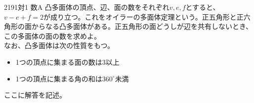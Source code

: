 \begin{thm}{219}{}{1対1 数A}
 凸多面体の頂点、辺、面の数をそれぞれ$v, e, f$とすると、$v-e+f=2$が成り立つ。これをオイラーの多面体定理という。正五角形と正六角形の面からなる凸多面体がある。正五角形の面どうしが辺を共有しないとき、この多面体の面の数を求めよ。\\
 なお、凸多面体は次の性質をもつ。
 \begin{itemize}
  \item 1つの頂点に集まる面の数は3以上
  \item 1つの頂点に集まる角の和は$360^\circ$未満
 \end{itemize}
\end{thm}

ここに解答を記述。